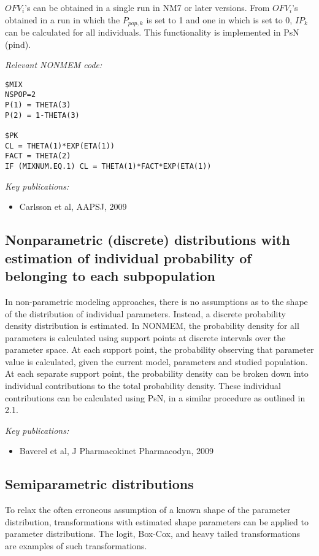 \documentclass[a4paper,11pt]{article}
\begin{document}
\vspace{10pt}

$OFV_i$'s can be obtained in a single run in NM7 or later
versions. From $OFV_i$'s obtained in a run in which the $P_{pop,k}$ is
set to 1 and one in which is set to 0, $IP_k$ can be calculated for all
individuals. This functionality is implemented in PsN (pind).

\noindent \emph{Relevant NONMEM code:}
\begin{lstlisting}
$MIX
NSPOP=2
P(1) = THETA(3)
P(2) = 1-THETA(3)

$PK
CL = THETA(1)*EXP(ETA(1))
FACT = THETA(2)
IF (MIXNUM.EQ.1) CL = THETA(1)*FACT*EXP(ETA(1))
\end{lstlisting}

\noindent \emph{Key publications:}
\begin{itemize}
\item Carlsson et al, AAPSJ, 2009
\end{itemize}

\subsection{Nonparametric (discrete) distributions with estimation of
  individual probability of belonging to each subpopulation}

In non-parametric modeling approaches, there is no assumptions as to
the shape of the distribution of individual parameters. Instead, a
discrete probability density distribution is estimated. In NONMEM, the
probability density for all parameters is calculated using support
points at discrete intervals over the parameter space. At each support
point, the probability observing that parameter value is calculated,
given the current model, parameters and studied population. At each
separate support point, the probability density can be broken down
into individual contributions to the total probability density. These
individual contributions can be calculated using PsN, in a similar
procedure as outlined in 2.1.

\vspace{10pt}

\noindent \emph{Key publications:}
\begin{itemize}
\item Baverel et al, J Pharmacokinet Pharmacodyn, 2009
\end{itemize}

\subsection{Semiparametric distributions}
To relax the often erroneous assumption of a known shape of the
parameter distribution, transformations with estimated shape
parameters can be applied to parameter distributions. The logit,
Box-Cox, and heavy tailed transformations are examples of such
transformations.
\end{document}
